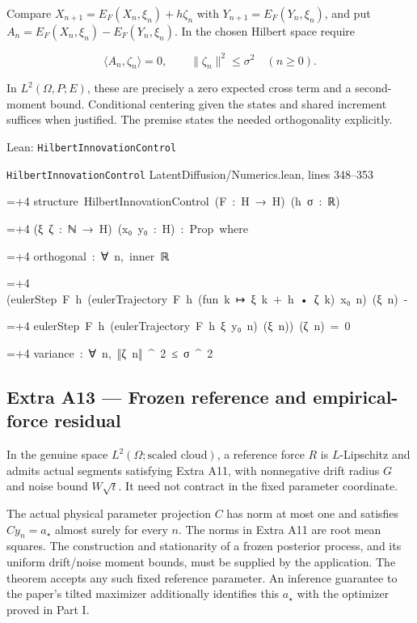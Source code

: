 \documentclass[11pt,a4paper]{report}
\newlength{\leancharwidth}
\newenvironment{leancode}{\par\smallskip\begingroup\ttfamily\footnotesize\raggedright
  \settowidth{\leancharwidth}{M}\setlength{\parskip}{0pt}\setlength{\parindent}{0pt}
  \frenchspacing}{\par\endgroup\smallskip}
\newcommand{\leanline}[2]{\hangindent=\dimexpr#1\leancharwidth+4\leancharwidth\relax
  \hangafter=1\noindent\hspace*{#1\leancharwidth}#2\par}
\newcommand{\leansource}[1]{\par{\footnotesize\color{leanmuted}#1}\par}
\begin{document}
Compare \(X_{n+1}=E_F(X_n,\xi_n)+h\zeta_n\) with \(Y_{n+1}=E_F(Y_n,\xi_n)\), and put \(A_n=E_F(X_n,\xi_n)-E_F(Y_n,\xi_n)\). In the chosen Hilbert space require



\[\langle A_n,\zeta_n\rangle=0,\qquad\|\zeta_n\|^2\le\sigma^2\quad(n\ge0).\]



In \(L^2(\Omega,P;E)\), these are precisely a zero expected cross term and a second-moment bound. Conditional centering given the states and shared increment suffices when justified. The premise states the needed orthogonality explicitly.

\begin{leanbox}{Lean: \texttt{HilbertInnovationControl}}
\leansource{\texttt{HilbertInnovationControl} \quad LatentDiffusion/\allowbreak{}Numerics.lean, lines 348–353}
\begin{leancode}
\leanline{0}{structure\ HilbertInnovationControl\ (F\ :\ H\ →\ H)\ (h\ σ\ :\ ℝ)}
\leanline{4}{(ξ\ ζ\ :\ ℕ\ →\ H)\ (x₀\ y₀\ :\ H)\ :\ Prop\ where}
\leanline{2}{orthogonal\ :\ ∀\ n,\ inner\ ℝ}
\leanline{4}{(eulerStep\ F\ h\ (eulerTrajectory\ F\ h\ (fun\ k\ ↦\ ξ\ k\ +\ h\ •\ ζ\ k)\ x₀\ n)\ (ξ\ n)\ -}
\leanline{6}{eulerStep\ F\ h\ (eulerTrajectory\ F\ h\ ξ\ y₀\ n)\ (ξ\ n))\ (ζ\ n)\ =\ 0}
\leanline{2}{variance\ :\ ∀\ n,\ ‖ζ\ n‖\ \textasciicircum{}\ 2\ ≤\ σ\ \textasciicircum{}\ 2}
\end{leancode}
\end{leanbox}
\subsection{\texorpdfstring{Extra A13 — Frozen reference and empirical-force residual}{Extra A13 — Frozen reference and empirical-force residual}}



In the genuine space \(L^2(\Omega;\text{scaled cloud})\), a reference force \(R\) is \(L\)-Lipschitz and admits actual segments satisfying Extra A11, with nonnegative drift radius \(G\) and noise bound \(W\sqrt t\). It need not contract in the fixed parameter coordinate.




The actual physical parameter projection \(C\) has norm at most one and satisfies \(Cy_n=a_\star\) almost surely for every \(n\). The norms in Extra A11 are root mean squares. The construction and stationarity of a frozen posterior process, and its uniform drift/\allowbreak{}noise moment bounds, must be supplied by the application. The theorem accepts any such fixed reference parameter. An inference guarantee to the paper's tilted maximizer additionally identifies this \(a_\star\) with the optimizer proved in Part I.
\end{document}
